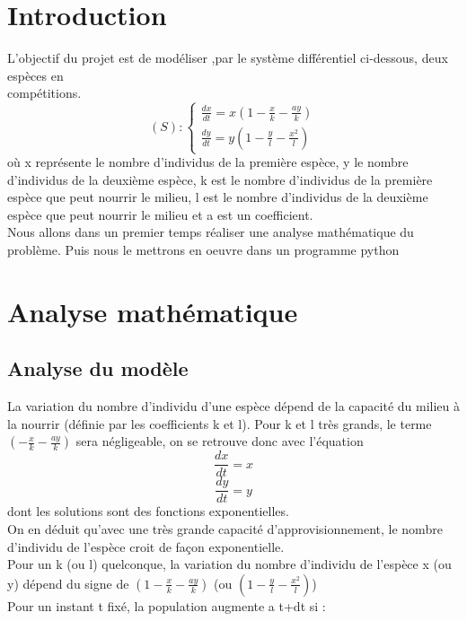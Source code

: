 \documentclass{article}
\begin{document}

\tableofcontents
\newpage

\setcounter{secnumdepth}{0}
\section{Introduction}
L'objectif du projet est de modéliser ,par le système différentiel ci-dessous, deux espèces en \\compétitions.
\begin{equation}
    (S):
\left\{
\begin{array}{ll}
\frac{dx}{dt} =  x(1 - \frac{x}{k} - \frac{a y}{k}) \\
\frac{dy}{dt} = y(1- \frac{y}{l} - \frac{x^{2}}{l})
\end{array}
\right.
\end{equation}
où x représente le nombre d’individus de la première espèce, y le nombre d’individus de la
deuxième espèce, k est le nombre d’individus de la première espèce que peut nourrir le milieu, l
est le nombre d’individus de la deuxième espèce que peut nourrir le milieu et a est un coefficient.\\Nous allons dans un premier temps réaliser une analyse mathématique du problème. Puis nous le mettrons en oeuvre dans un programme python 

\setcounter{secnumdepth}{1}

\section{Analyse mathématique}

\subsection{Analyse du modèle}
La variation du nombre d'individu d'une espèce dépend de la capacité du milieu à la nourrir (définie par les coefficients k et l). Pour k et l très grands, le terme $(- \frac{x}{k} - \frac{a y}{k})$ sera négligeable, on se retrouve donc avec l'équation
\[\frac{dx}{dt} =x\] \[\frac{dy}{dt} = y\] dont les solutions sont des fonctions exponentielles. \\ On en déduit qu'avec une très grande capacité d'approvisionnement, le nombre d'individu de l'espèce croit de façon exponentielle. \\ Pour un k (ou l) quelconque, la variation du nombre d'individu de l'espèce x (ou y) dépend du signe de  $(1 - \frac{x}{k} - \frac{a y}{k})$ (ou $ (1 -\frac{y}{l} - \frac{x^{2}}{l})$)\\ Pour un instant t fixé, la population augmente a t+dt si :
\end{document}
